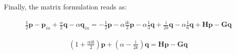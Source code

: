 \documentclass[a4paper, 10pt]{article}
\newcommand{\ti}{\mathrm{i}}
\newcommand{\bp}{\mathbf{p}}
\newcommand{\bq}{\mathbf{q}}
\newcommand{\bH}{\mathbf{H}}
\newcommand{\bG}{\mathbf{G}}
\begin{document}
Finally, the matrix formulation reads as:

\begin{align}
	\frac{1}{2} \mathbf{p} - \mathbf{p}_{in} + \frac{\alpha}{2} \mathbf{q} - \alpha \mathbf{q}_{in} = - \frac{1}{2} \bp - \alpha \frac{\ti k}{2} \bp - \alpha \frac{1}{3} \bq 
	+ \frac{\ti }{2k} \bq - \alpha \frac{1}{6} \bq + \bH \bp - \bG \bq
\end{align}

\begin{align}
	\left(1 + \frac{\alpha \ti k}{2}\right)\bp + \left(\alpha - \frac{\ti }{2 k}\right) \bq =\bH \bp - \bG \bq
\end{align}
\end{document}
